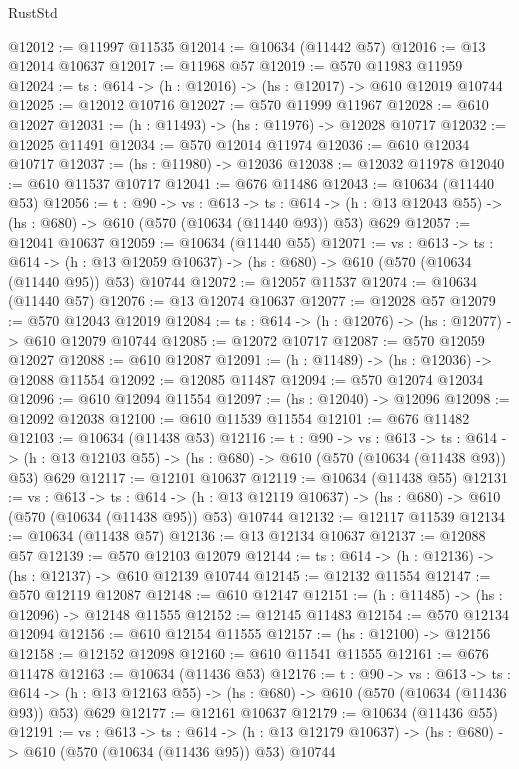 \begin{lexlean}{RustStd}
\begin{coremodule}
@12012 := @11997 @11535
@12014 := @10634 (@11442 @57)
@12016 := @13 @12014 @10637
@12017 := @11968 @57
@12019 := @570 @11983 @11959
@12024 := {ts : @614} -> (h : @12016) -> (hs : @12017) -> @610 @12019 @10744
@12025 := @12012 @10716
@12027 := @570 @11999 @11967
@12028 := @610 @12027
@12031 := (h : @11493) -> (hs : @11976) -> @12028 @10717
@12032 := @12025 @11491
@12034 := @570 @12014 @11974
@12036 := @610 @12034 @10717
@12037 := (hs : @11980) -> @12036
@12038 := @12032 @11978
@12040 := @610 @11537 @10717
@12041 := @676 @11486
@12043 := @10634 (@11440 @53)
@12056 := {t : @90} ->
  {vs : @613} ->
  {ts : @614} -> (h : @13 @12043 @55) -> (hs : @680) -> @610 (@570 (@10634 (@11440 @93)) @53) @629
@12057 := @12041 @10637
@12059 := @10634 (@11440 @55)
@12071 := {vs : @613} ->
  {ts : @614} ->
  (h : @13 @12059 @10637) -> (hs : @680) -> @610 (@570 (@10634 (@11440 @95)) @53) @10744
@12072 := @12057 @11537
@12074 := @10634 (@11440 @57)
@12076 := @13 @12074 @10637
@12077 := @12028 @57
@12079 := @570 @12043 @12019
@12084 := {ts : @614} -> (h : @12076) -> (hs : @12077) -> @610 @12079 @10744
@12085 := @12072 @10717
@12087 := @570 @12059 @12027
@12088 := @610 @12087
@12091 := (h : @11489) -> (hs : @12036) -> @12088 @11554
@12092 := @12085 @11487
@12094 := @570 @12074 @12034
@12096 := @610 @12094 @11554
@12097 := (hs : @12040) -> @12096
@12098 := @12092 @12038
@12100 := @610 @11539 @11554
@12101 := @676 @11482
@12103 := @10634 (@11438 @53)
@12116 := {t : @90} ->
  {vs : @613} ->
  {ts : @614} -> (h : @13 @12103 @55) -> (hs : @680) -> @610 (@570 (@10634 (@11438 @93)) @53) @629
@12117 := @12101 @10637
@12119 := @10634 (@11438 @55)
@12131 := {vs : @613} ->
  {ts : @614} ->
  (h : @13 @12119 @10637) -> (hs : @680) -> @610 (@570 (@10634 (@11438 @95)) @53) @10744
@12132 := @12117 @11539
@12134 := @10634 (@11438 @57)
@12136 := @13 @12134 @10637
@12137 := @12088 @57
@12139 := @570 @12103 @12079
@12144 := {ts : @614} -> (h : @12136) -> (hs : @12137) -> @610 @12139 @10744
@12145 := @12132 @11554
@12147 := @570 @12119 @12087
@12148 := @610 @12147
@12151 := (h : @11485) -> (hs : @12096) -> @12148 @11555
@12152 := @12145 @11483
@12154 := @570 @12134 @12094
@12156 := @610 @12154 @11555
@12157 := (hs : @12100) -> @12156
@12158 := @12152 @12098
@12160 := @610 @11541 @11555
@12161 := @676 @11478
@12163 := @10634 (@11436 @53)
@12176 := {t : @90} ->
  {vs : @613} ->
  {ts : @614} -> (h : @13 @12163 @55) -> (hs : @680) -> @610 (@570 (@10634 (@11436 @93)) @53) @629
@12177 := @12161 @10637
@12179 := @10634 (@11436 @55)
@12191 := {vs : @613} ->
  {ts : @614} ->
  (h : @13 @12179 @10637) -> (hs : @680) -> @610 (@570 (@10634 (@11436 @95)) @53) @10744

\end{coremodule}
\end{lexlean}
